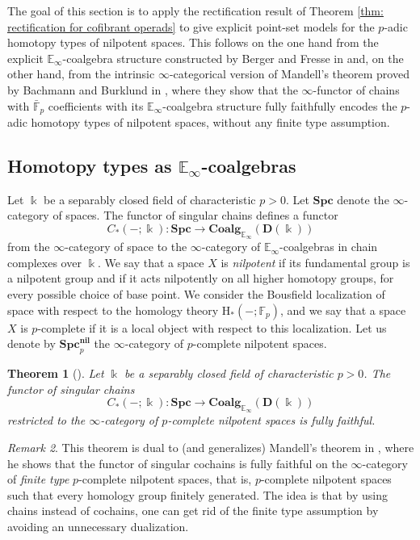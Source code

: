 \documentclass[a4paper,12pt]{amsart}
\theoremstyle{plain}
\newtheorem{theorem}{Theorem}[section]
\theoremstyle{definition}
\theoremstyle{remark}
\newtheorem{remark}[theorem]{\sc Remark}%
\newcommand{\kk}{\Bbbk}
\begin{document}
The goal of this section is to apply the rectification result of Theorem \ref{thm: rectification for cofibrant operads} to give explicit point-set models for the $p$-adic homotopy types of nilpotent spaces. This follows on the one hand from the explicit $\mathbb{E}_\infty$-coalgebra structure constructed by Berger and Fresse in \cite{BergerFresse} and, on the other hand, from the intrinsic $\infty$-categorical version of Mandell's theorem proved by Bachmann and Burklund in \cite{bachmann2024}, where they show that the $\infty$-functor of chains with $\bar{\mathbb{F}}_p$ coefficients with its $\mathbb{E}_\infty$-coalgebra structure fully faithfully encodes the $p$-adic homotopy types of nilpotent spaces, without any finite type assumption.

\subsection{Homotopy types as $\mathbb{E}_\infty$-coalgebras}
Let $\kk$ be a separably closed field of characteristic $p >0$. Let $\mathbf{Spc}$ denote the $\infty$-category of spaces. The functor of singular chains defines a functor 
\[
C_*(-;\kk): \mathbf{Spc} \longrightarrow \mathbf{Coalg}_{\mathbb{E}_\infty}(\mathbf{D}(\kk)) 
\]
from the $\infty$-category of space to the $\infty$-category of $\mathbb{E}_\infty$-coalgebras in chain complexes over $\kk$. We say that a space $X$ is \textit{nilpotent} if its fundamental group is a nilpotent group and if it acts nilpotently on all higher homotopy groups, for every possible choice of base point. We consider the Bousfield localization of space with respect to the homology theory $\mathrm{H}_*(-; \mathbb{F}_p)$, and we say that a space $X$ is $p$-complete if it is a local object with respect to this localization. Let us denote by $\mathbf{Spc}_p^{\mathbf{nil}}$ the $\infty$-category of $p$-complete nilpotent spaces. 

\begin{theorem}[{\cite[Theorem 1.2]{bachmann2024}}]\label{thm: bachmann-burklund}
Let $\kk$ be a separably closed field of characteristic $p >0$. The functor of singular chains
\[
C_*(-;\kk): \mathbf{Spc} \longrightarrow \mathbf{Coalg}_{\mathbb{E}_\infty}(\mathbf{D}(\kk)) 
\]
restricted to the $\infty$-category of $p$-complete nilpotent spaces is fully faithful. 
\end{theorem}

\begin{remark}
This theorem is dual to (and generalizes) Mandell's theorem in \cite{Mandell01}, where he shows that the functor of singular cochains is fully faithful on the $\infty$-category of \textit{finite type} $p$-complete nilpotent spaces, that is, $p$-complete nilpotent spaces such that every homology group finitely generated. The idea is that by using chains instead of cochains, one can get rid of the finite type assumption by avoiding an unnecessary dualization. 
\end{remark}
\end{document}
